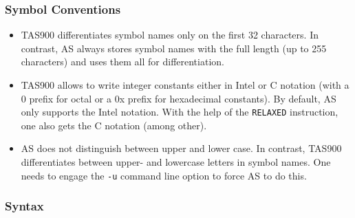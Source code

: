 \documentclass[12pt,twoside]{report}
\newcommand{\tty}[1]{{\tt #1}}
\begin{document}
\subsubsection{Symbol Conventions}

\begin{itemize}
\item{TAS900 differentiates symbol names only on the first 32
      characters.  In contrast, AS always stores symbol names with the
      full length (up to 255 characters) and uses them all for
      differentiation.}
\item{TAS900 allows to write integer constants either in Intel or C
      notation (with a 0 prefix for octal or a 0x prefix for hexadecimal
      constants).  By default, AS only supports the Intel notation.
      With the help of the \tty{RELAXED} instruction, one also gets the C
      notation (among other).}
\item{AS does not distinguish between upper and lower case.  In
      contrast, TAS900 differentiates between upper- and lowercase
      letters in symbol names.  One needs to engage the \tty{-u} command
      line option to force AS to do this.}
\end{itemize}

\subsubsection{Syntax}
\end{document}
